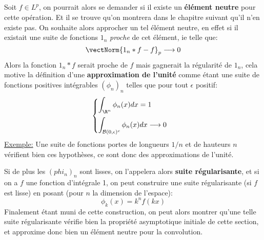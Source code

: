 \subsection*{}
Soit \( f \in L^p \), on pourrait alors se demander si il existe un \textbf{élément neutre} pour cette opération. Et il se trouve qu'on montrera dans le chapitre suivant qu'il n'en existe pas. On souhaite alors approcher un tel élément neutre, en effet si il existait une suite de fonctions \( 1_n \) \textit{proche} de cet élément, ie telle que:
\[ 
   \vectNorm{1_n * f - f}_p \longrightarrow 0
\]
Alors la fonction \( 1_n * f \) serait proche de \( f \) mais gagnerait la régularité de \( 1_n \), cela motive la définition d'une \textbf{approximation de l'unité} comme étant une suite de fonctions positives intégrables \( (\phi_n)_n \) telles que pour tout \( \epsilon \) positif:
\[ 
   \begin{cases}
      \displaystyle \int_{\R^n} \phi_n(x) dx = 1\vspace{5pt} \\
      \displaystyle \int_{\mathcal{B}(0, \epsilon)^c} \phi_n(x) dx \longrightarrow 0
   \end{cases} 
\]
\uline{Exemple:} Une suite de fonctions portes de longueurs \( 1/n \) et de hauteurs \( n \) vérifient bien ces hypothèses, ce sont donc des approximations de l'unité.\<

Si de plus les \( (phi_n)_n \) sont lisses, on l'appelera alors \textbf{suite régularisante}, et si on a \( f \) une fonction d'intégrale 1, on peut construire une suite régularisante (si \( f \) est lisse) en posant (pour \( n \) la dimension de l'espace):
\[ 
   \phi_k(x) = k^n f(kx)
\]
Finalement étant muni de cette construction, on peut alors montrer qu'une telle suite régularisante vérifie bien la propriété asymptotique initiale de cette section, et approxime donc bien un élément neutre pour la convolution.
